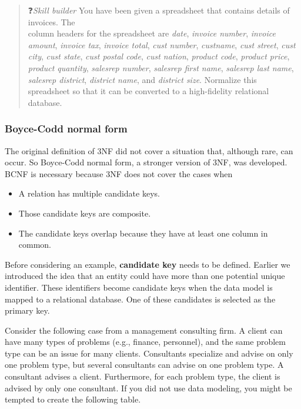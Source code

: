 \documentclass[
]{article}
\begin{document}
\begin{quote}
❓\emph{Skill builder} You have been given a spreadsheet that contains
details of invoices. The\\
column headers for the spreadsheet are \emph{date}, \emph{invoice number},
\emph{invoice amount}, \emph{invoice tax}, \emph{invoice total}, \emph{cust number},
\emph{custname}, \emph{cust street}, \emph{cust city}, \emph{cust state}, \emph{cust postal
code}, \emph{cust nation}, \emph{product code}, \emph{product price}, \emph{product
quantity}, \emph{salesrep number}, \emph{salesrep first name}, \emph{salesrep last
name}, \emph{salesrep district}, \emph{district name}, and \emph{district size}.
Normalize this spreadsheet so that it can be converted to a
high-fidelity relational database.
\end{quote}

\hypertarget{boyce-codd-normal-form}{%
\subsubsection*{Boyce-Codd normal form}\label{boyce-codd-normal-form}}

The original definition of 3NF did not cover a situation that, although
rare, can occur. So Boyce-Codd normal form, a stronger version of 3NF,
was developed. BCNF is necessary because 3NF does not cover the cases
when

\begin{itemize}
\item
  A relation has multiple candidate keys.
\item
  Those candidate keys are composite.
\item
  The candidate keys overlap because they have at least one column in
  common.
\end{itemize}

Before considering an example, \textbf{candidate key} needs to be defined.
Earlier we introduced the idea that an entity could have more than one
potential unique identifier. These identifiers become candidate keys
when the data model is mapped to a relational database. One of these
candidates is selected as the primary key.

Consider the following case from a management consulting firm. A client
can have many types of problems (e.g., finance, personnel), and the same
problem type can be an issue for many clients. Consultants specialize
and advise on only one problem type, but several consultants can advise
on one problem type. A consultant advises a client. Furthermore, for
each problem type, the client is advised by only one consultant. If you
did not use data modeling, you might be tempted to create the following
table.
\end{document}
